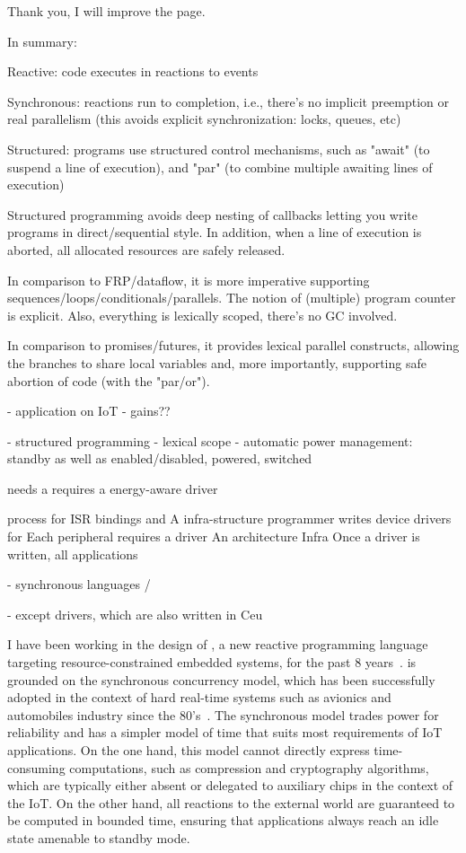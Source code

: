  Thank you, I will improve the page.

In summary:

Reactive: code executes in reactions to events

Synchronous: reactions run to completion, i.e., there's no implicit preemption or real parallelism (this avoids explicit synchronization: locks, queues, etc)

Structured: programs use structured control mechanisms, such as "await" (to suspend a line of execution), and "par" (to combine multiple awaiting lines of execution)

Structured programming avoids deep nesting of callbacks letting you write programs in direct/sequential style. In addition, when a line of execution is aborted, all allocated resources are safely released.

In comparison to FRP/dataflow, it is more imperative supporting sequences/loops/conditionals/parallels. The notion of (multiple) program counter is explicit. Also, everything is lexically scoped, there's no GC involved.

In comparison to promises/futures, it provides lexical parallel constructs, allowing the branches to share local variables and, more importantly, supporting safe abortion of code (with the "par/or").




- application on IoT
- gains??


- structured programming
- lexical scope
- automatic power management: standby as well as enabled/disabled, powered, switched

needs a requires a energy-aware driver 

process for ISR bindings and
A infra-structure programmer writes device drivers for
Each peripheral requires a driver
An architecture
Infra
Once a driver is written, all applications 

- synchronous languages / \CEU

- except drivers, which are also written in Ceu

I have been working in the design of \CEU, a new reactive programming language
targeting resource-constrained embedded systems, for the past 8
years~\cite{ceu.sensys11,ceu.tr,ceu.sensys13,ceu.rem13,ceu.phd,ceu.rebls14,
ceu.mod15,ceu.rebls15,ceu.terra,ceu.media.webmedia16,ceu.tecs17}.
%
\CEU is grounded on the synchronous concurrency model, which has been
successfully adopted in the context of hard real-time systems such as avionics
and automobiles industry since the 80's~\cite{rp.twelve}.
%
The synchronous model trades power for reliability and has a simpler model
of time that suits most requirements of IoT applications.
%
On the one hand, this model cannot directly express time-consuming
computations, such as compression and cryptography algorithms, which are
typically either absent or delegated to auxiliary chips in the context of the
IoT.
%
On the other hand, all reactions to the external world are guaranteed to be
computed in bounded
time, ensuring that applications always reach an idle state amenable to standby
mode.

